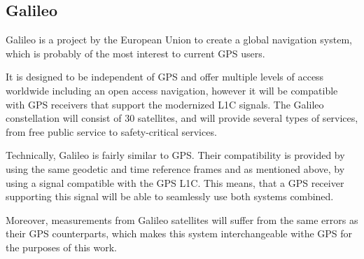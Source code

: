 \subsection{Galileo}
\label{sec:galileo}

Galileo \cite{galileo} is a project by the European Union to create a global navigation system, which
is probably of the most interest to current GPS users.

It is designed to be independent of GPS and offer multiple levels of access worldwide
including an open access navigation, however
it will be compatible with GPS receivers that support the modernized L1C signals.
The Galileo constellation will consist of 30 satellites, and will provide several types of services,
from free public service to safety-critical services.

Technically, Galileo is fairly similar to GPS.
Their compatibility is provided by using the same geodetic and time reference frames
and as mentioned above, by using a signal compatible with the GPS L1C.
This means, that a GPS receiver supporting this signal will be able to seamlessly
use both systems combined.

Moreover, measurements from Galileo satellites will suffer from the same errors as
their GPS counterparts, which makes this system interchangeable withe GPS for the purposes
of this work.

